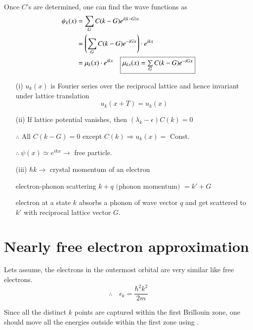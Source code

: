 Once $C$'s are determined, one can find the wave functions as
\begin{align*}
\psi_{k}(x) &= \sum\limits_{G}C(k-G)e^{i(k-G)x}\\
&= \left(\sum\limits_{G}C(k-G)e^{-iGx}\right)\cdot e^{ikx}\\
&= \mu_{k}(x)\cdot e^{ikx}\quad \fbox{$\mu_{kx}(x)=\sum\limits_{G}C(k-G)e^{-iGx}$}
\end{align*}
\begin{itemize}
\item[(i)] $u_{k}(x)$ is Fourier series over the reciprocal lattice and hence invariant under lattice translation
$$
u_{k}(x+T)=u_{k}(x)
$$

\item[(ii)] If lattice potential vanishes, then $(\lambda_{k}-\epsilon)C(k)=0$

$\therefore$ All $C(k-G)=0$ except $C(k)\Rightarrow u_{k}(x)=$ Const.

$\therefore \ \psi(x)\simeq e^{ikx}\to$ free particle.

\item[(iii)] $\hbar k\to$ crystal momentum of an electron

electron-phonon scattering $k+q \text{ (phonon momentum) } = k'+G$

electron at a state $k$ absorbs a phonon of wave vector $q$ and get scattered to $k'$ with reciprocal lattice vector $G$.
\end{itemize}

\section*{Nearly free electron approximation}

Lets assume, the electrons in the outermost orbital are very similar like free electrons.
$$
\therefore\quad \epsilon_{k}=\dfrac{\hbar^{2}k^{2}}{2m}
$$

Since all the distinct $k$ points are captured within the first Brillouin zone, one should move all the energies outside within the first zone using .

